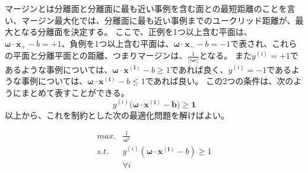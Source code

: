 \documentclass[titlepage,12pt]{jreport}
\begin{document}

マージンとは分離面と分離面に最も近い事例を含む面との最短距離のことを言い、マージン最大化では、分離面に最も近い事例までのユークリッド距離が、最大となる分離面を決定する。 ここで、正例を1つ以上含む平面は、\(\bm{\omega} \cdot \bm{x}_{+} - b = +1\)、負例を1つ以上含む平面は、\(\bm{\omega} \cdot \bm{x}_{-} - b = -1\)で表され、これらの平面と分離平面との距離、つまりマージンは、\(\frac{1}{||\bm{\omega}||}\)となる。 また\(y^{(i)}= +1\)であるような事例については、\(\bm{\omega} \cdot \bm{x^{(i)}} - b \geq 1\)であれば良く、\(y^{(i)}= -1\)であるような事例については、\(\bm{\omega} \cdot \bm{x^{(i)}} - b \leq 1\)であれば良い。 この2つの条件は、次のようにまとめて表すことができる。
\begin{equation}
y^{(i)}(\bm{\omega} \cdot \bm{x^{(i)} - b) \geq 1}
\end{equation}
以上から、これを制約とした次の最適化問題を解けばよい。

\begin{equation}
\begin{array}{ll}
max. & \frac{1}{\bm{\omega}^{2}}\\
s.t. & y^{(i)}(\bm{\omega} \cdot \bm{x^{(i)}} - b) \geq 1 \\
	& \forall i
\end{array}
\end{equation}
\end{document}
